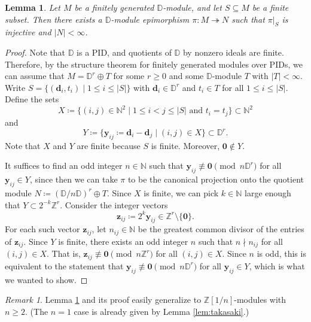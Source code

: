 \documentclass[12pt]{amsart}
\newtheorem{lem}[thm]{Lemma}
\theoremstyle{definition}
\theoremstyle{remark}
\newtheorem{rmk}[thm]{Remark}
\newcommand{\Z}{\mathbb{Z}}
\begin{document}
\begin{lem}\label{lem:comm}
    Let $M$ be a finitely generated $\mathbb{D}$-module, and let $S\subseteq M$ be a finite subset. Then there exists a $\mathbb{D}$-module epimorphism $\pi\colon M\twoheadrightarrow N$ such that $\pi|_S$ is injective and $|N|<\infty$.
\end{lem}

\begin{proof}
    Note that $\mathbb{D}$ is a PID, and quotients of $\mathbb{D}$ by nonzero ideals are finite. Therefore, by the structure theorem for finitely generated modules over PIDs, we can assume that $M=\mathbb{D}^r\oplus T$ for some $r\geq 0$ and some $\mathbb{D}$-module $T$ with $|T|<\infty$.
    Write $S=\{(\mathbf{d}_i, t_i)\mid 1\leq i\leq |S|\}$ with $\mathbf{d}_i\in\mathbb{D}^r$ and $t_i\in T$ for all $1\leq i\leq |S|$. Define the sets \[X\coloneq\{(i,j)\in\mathbb{N}^2\mid 1 \leq i<j\leq |S|\text{ and }t_i=t_j\}\subset\mathbb{N}^2\]
    and
    \[Y\coloneq\{\mathbf{y}_{ij}\coloneq \mathbf{d}_i-\mathbf{d}_j\mid (i,j)\in X\}\subset\mathbb{D}^r.\] Note that $X$ and $Y$ are finite because $S$ is finite. Moreover, $\mathbf{0}\notin Y$. 
    
    It suffices to find an odd integer $n\in\mathbb{N}$ such that $\mathbf{y}_{ij}\not\equiv \mathbf{0}\pmod{n\mathbb{D}^r}$ for all $\mathbf{y}_{ij}\in Y$, since then we can take $\pi$ to be the canonical projection onto the quotient module $N\coloneq (\mathbb{D}/n\mathbb{D})^r\oplus T$. 
    Since $X$ is finite, we can pick $k\in\mathbb{N}$ large enough that $Y\subset 2^{-k}\mathbb{Z}^r$. Consider the integer vectors \[\mathbf{z}_{ij}\coloneq 2^k \mathbf{y}_{ij}\in \mathbb{Z}^r\setminus\{\mathbf{0}\}.\] For each such vector $\mathbf{z}_{ij}$, let $n_{ij}\in\mathbb{N}$ be the greatest common divisor of the entries of $\mathbf{z}_{ij}$. Since $Y$ is finite, there exists an odd integer $n$ such that $n\nmid n_{ij}$ for all $(i,j)\in X$. That is, $\mathbf{z}_{ij}\not\equiv \mathbf{0}\pmod{n\mathbb{Z}^r}$ for all $(i,j)\in X$. Since $n$ is odd, this is equivalent to the statement that $\mathbf{y}_{ij}\not\equiv \mathbf{0}\pmod{n\mathbb{D}^r}$ for all $\mathbf{y}_{ij}\in Y$, which is what we wanted to show.
\end{proof}

\begin{rmk}
    Lemma \ref{lem:comm} and its proof easily generalize to $\Z[1/n]$-modules with $n\geq 2$. (The $n=1$ case is already given by Lemma \ref{lem:takasaki}.)
\end{rmk}
\end{document}
